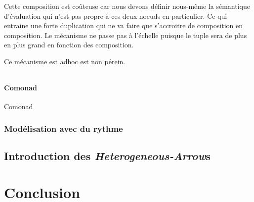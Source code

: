 \documentclass{llncs}
\newcommand{\SAs}{\emph{Heterogeneous-Arrow}s }
\begin{document}
Cette composition est coûteuse car nous devons définir nous-même la sémantique
d'évaluation qui n'est pas propre à ces deux noeuds en particulier.
Ce qui entraine une forte duplication qui ne va faire que s'accroitre de
composition en composition.
Le mécanisme ne passe pas à l'échelle puisque le tuple sera de plus en plus
grand en fonction des composition.

Ce mécanisme est adhoc est non pérein.

\begin{lstlisting}
\end{lstlisting}

\paragraph{Comonad}
Comonad~\cite{Brookes91}~\cite{Coutts07}

\subsubsection{Modélisation avec du rythme}

\subsection{Introduction des \SAs}

\section{Conclusion}

% 

% 



\end{document}
